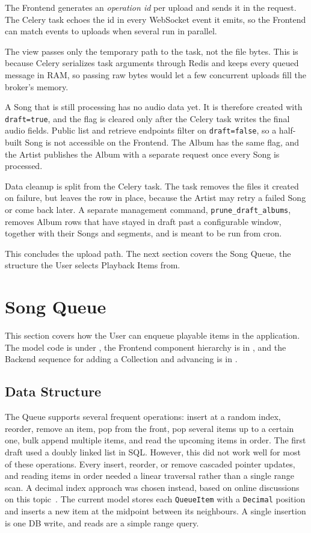 The Frontend generates an \textit{operation id} per upload and sends
it in the request. The Celery task echoes the id in every WebSocket
event it emits, so the Frontend can match events to uploads when
several run in parallel.

The view passes only the temporary path to the task, not the file
bytes. This is because Celery serializes task arguments through Redis
and keeps every queued message in RAM, so passing raw bytes would let
a few concurrent uploads fill the broker's memory.

A Song that is still processing has no audio data yet. It is
therefore created with \texttt{draft=true}, and the flag is cleared
only after the Celery task writes the final audio fields.
Public list and retrieve endpoints filter on
\texttt{draft=false}, so a half-built Song is not accessible on the Frontend.
The Album has the same flag, and the Artist publishes the
Album with a separate request once every Song is processed.

Data cleanup is split from the Celery task. The task removes the
files it created on failure, but leaves the row in place, because
the Artist may retry a failed Song or come back later. A separate
management command, \texttt{prune\_draft\_albums}, removes Album
rows that have stayed in draft past a configurable window, together
with their Songs and segments, and is meant to be run from cron.

This concludes the upload path. The next section covers the Song
Queue, the structure the User selects Playback Items from.


\section{Song Queue}\label{sec:song_queue}
This section covers how the User can enqueue playable items in the application.
The model code is under ,
the Frontend component hierarchy is in
, and the Backend sequence
for adding a Collection and advancing is in
.

\subsection{Data Structure}
The Queue supports several frequent operations: insert at a random
index, reorder, remove an item, pop from the front, pop several items
up to a certain one, bulk append multiple items, and read the upcoming
items in order. The first draft used a doubly linked list in SQL\@.
However, this did not work well for most of these operations. Every
insert, reorder, or remove cascaded pointer updates, and reading items
in order needed a linear traversal rather than a single range scan. A
decimal index approach was chosen instead, based on online discussions
on this topic~\parencite{llsql1,llsql2}. The current model stores each
\texttt{QueueItem} with a \texttt{Decimal} position and inserts a new
item at the midpoint between its neighbours. A single insertion is one
DB write, and reads are a simple range query.

